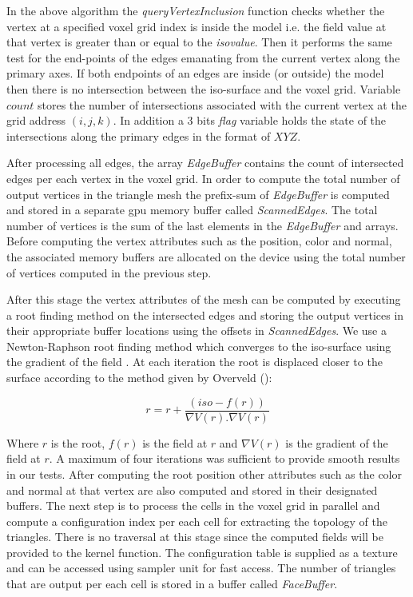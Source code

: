 In the above algorithm the \textit{queryVertexInclusion} function checks whether the vertex at a specified
voxel grid index is inside the model i.e. the field value at that vertex is greater than or equal to the \textit{isovalue}.
Then it performs the same test for the end-points of the edges emanating from the current vertex along the primary axes.
If both endpoints of an edges are inside (or outside) the model then there is no intersection between the iso-surface and
the voxel grid. Variable $count$ stores the number of intersections associated with the current vertex at the grid address 
$\left(i, j, k\right)$. In addition a 3 bits \textit{flag} variable holds the state of the intersections along the primary 
edges in the format of $XYZ$.

After processing all edges, the array \textit{EdgeBuffer} contains the count of intersected edges per each vertex 
in the voxel grid. In order to compute the total number of output vertices in the triangle mesh the prefix-sum 
\cite{Sengupta2007} of \textit{EdgeBuffer} is computed and stored in a separate gpu memory buffer called 
\textit{ScannedEdges}. The total number of vertices is the sum of the last elements in the \textit{EdgeBuffer} 
and  arrays. Before computing the vertex attributes such as the position, color and normal, the associated 
memory buffers are allocated on the device using the total number of vertices computed in the previous step. 

After this stage the vertex attributes of the mesh can be computed by executing a root finding method on the intersected 
edges and storing the output vertices in their appropriate buffer locations using the offsets in \textit{ScannedEdges}.
We use a Newton-Raphson root finding method which converges to the iso-surface using the gradient of the field \cite{Matthews1987}.
At each iteration the root is displaced closer to the surface according to the method given by Overveld \etal (\cite{VanOverveld2004}):

\begin{equation}
 r = r + \frac{\left(iso - f(r)\right)}{\nabla V(r).\nabla V(r)}
\end{equation}

Where $r$ is the root, $f(r)$ is the field at $r$ and $\nabla V(r)$ is the gradient of the field at $r$.
A maximum of four iterations was sufficient to provide smooth results in our tests. 
After computing the root position other attributes such as the color and normal at that vertex are also computed and stored in their 
designated buffers. The next step is to process the cells in the voxel grid in parallel and compute a configuration index per each cell
for extracting the topology of the triangles. There is no \blob traversal at this stage since the computed fields will be provided
to the kernel function. The configuration table is supplied as a texture and can be accessed using sampler unit for 
fast access. The number of triangles that are output per each cell is stored in a buffer called \textit{FaceBuffer}.

